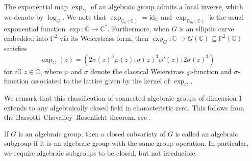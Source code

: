 \documentclass[12pt, reqno]{amsart}
\newcommand{\G}{\mathbb{G}}
\renewcommand{\P}{\mathbb{P}}
\newcommand{\id}{\textrm{id}}
\newcommand{\C}{\mathbb{C}}
\theoremstyle{remark}
\theoremstyle{definition}
\numberwithin{equation}{section}
\begin{document}
The exponential map $\exp_G$ of an algebraic group admits a local inverse, which we denote by $\log_G$. We note that $\exp_{\G_a(\C)} = \id_{\C}$ and $\exp_{\G_m(\C)}$ is the usual exponential function $\exp : \C \to \C^\ast$. Furthermore, when $G$ is an elliptic curve embedded into $\P^2$ via its Weierstrass form, then $\exp_G : \C \to G(\C) 
    \subseteq \P^2(\C)$  satisfies
\[   \exp_G(z) =(2\sigma(z)^3 \wp(z) : \sigma(z)^3 \wp'(z) : 2\sigma(z)^3) \]
for all $z \in \mathbb{C}$, where $\wp$ and $\sigma$ denote the classical Weierstrass $\wp$-function and $\sigma$-function associated to the lattice given by the kernel of $\exp_G$.

We remark that this classification of connected algebraic groups of dimension $1$ extends to any algebraically closed field in characteristic zero. This follows from the Barsotti--Chevalley--Rosenlicht theorem, see \cite[Theorem 10.25]{Milne_algebraic_groups}.

If $G$ is an algebraic group, then a closed subvariety of $G$ is called an algebraic subgroup if it is an algebraic group with the same group operation. In particular, we require algebraic subgroups to be closed, but not irreducible.
\end{document}
